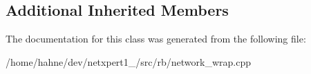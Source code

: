 \subsection*{Additional Inherited Members}


The documentation for this class was generated from the following file\+:\begin{DoxyCompactItemize}
\item 
/home/hahne/dev/netxpert1\+\_/src/rb/network\+\_\+wrap.\+cpp\end{DoxyCompactItemize}
